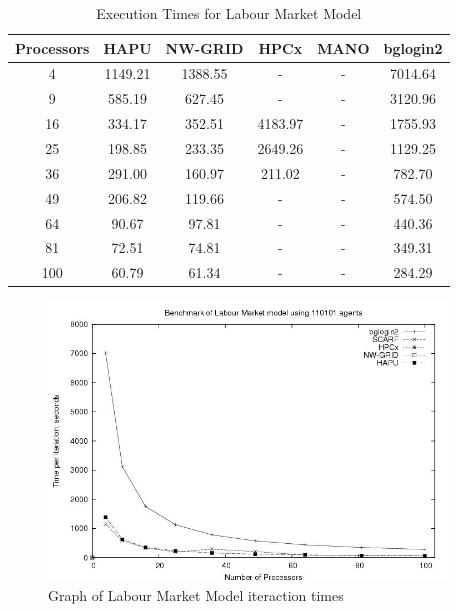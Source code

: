 {
\renewcommand{\arraystretch}{1.25}
\begin{table}[ht]
 \centering
  \begin{tabular}{c|ccccc}
 Processors &HAPU  &NW-GRID &HPCx  &MANO   &bglogin2 \\ \hline
4 &1149.21 &1388.55 &- &- &7014.64      \\
9 &585.19 &627.45 &- &- &3120.96        \\
16 &334.17 &352.51 &4183.97 &- &1755.93 \\
25 &198.85 &233.35 &2649.26 &- &1129.25 \\
36 &291.00 &160.97 &211.02 &- &782.70   \\
49 &206.82 &119.66 &- &- &574.50        \\
64 &90.67 &97.81 &- &- &440.36  \\
81 &72.51 &74.81 &- &- &349.31  \\
100 &60.79 &61.34 &- &- &284.29 \\

 \end{tabular}
 \caption{Execution Times for Labour Market Model}
 \label{tab:ExecutionTimesForLabour}
\end{table}
}
\bigskip
\begin{figure}[ht]
 \centering
  \includegraphics[width=300pt]{Labour2-graph.jpg}
 \caption{Graph of Labour Market Model iteraction times}
 \label{fig:Labour-graph1}
\end{figure}

